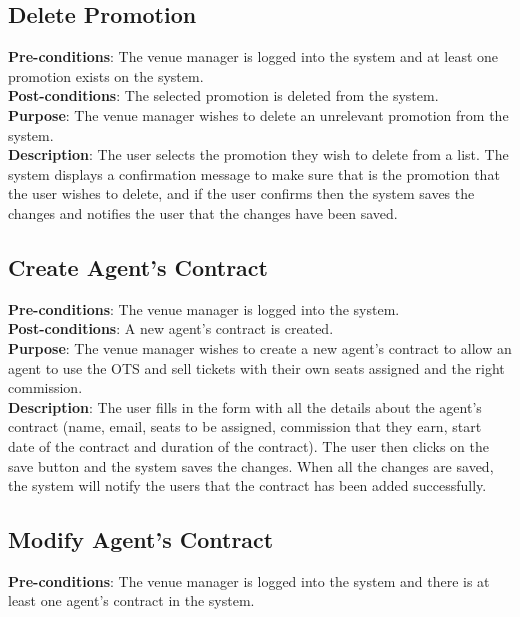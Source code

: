 \subsection{Delete Promotion}
\textbf{Pre-conditions}: The venue manager is logged into the system
and at least one promotion exists on the system.\\

\textbf{Post-conditions}: The selected promotion is deleted from the
system.\\

\textbf{Purpose}: The venue manager wishes to delete an unrelevant
promotion from the system.\\

\textbf{Description}: The user selects the promotion they wish to
delete from a list. The system displays a confirmation message
to make sure that is the promotion that the user wishes to delete,
and if the user confirms then the system saves the changes and
notifies the user that the changes have been saved.

\subsection{Create Agent's Contract}
\textbf{Pre-conditions}: The venue manager is logged into the system.\\

\textbf{Post-conditions}: A new agent's contract is created.\\

\textbf{Purpose}: The venue manager wishes to create a new agent's
contract to allow an agent to use the OTS and sell tickets with their own
seats assigned and the right commission.\\

\textbf{Description}: The user fills in the form with all the details
about the agent's contract (name, email, seats to be assigned,
commission that they earn, start date of the contract and duration
of the contract). The user then clicks on the save button and the
system saves the changes. When all the changes are saved, the
system will notify the users that the contract has been added
successfully.

\subsection{Modify Agent's Contract}
\textbf{Pre-conditions}: The venue manager is logged into the system
and there is at least one agent's contract in the system.\\

